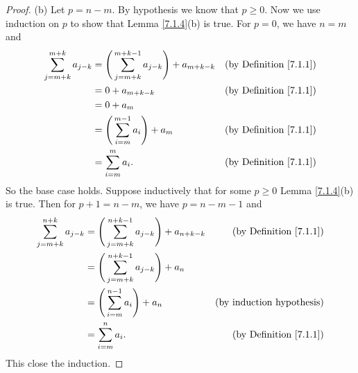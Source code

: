 \begin{proof}{(b)}
    Let \(p = n - m\).
    By hypothesis we know that \(p \geq 0\).
    Now we use induction on \(p\) to show that Lemma \ref{7.1.4}(b) is true.
    For \(p = 0\), we have \(n = m\) and
    \begin{align*}
        \sum_{j = m + k}^{m + k} a_{j - k} & = \Bigg(\sum_{j = m + k}^{m + k - 1} a_{j - k}\Bigg) + a_{m + k - k} & \text{(by Definition \ref{7.1.1})} \\
                                           & = 0 + a_{m + k - k}                                                  & \text{(by Definition \ref{7.1.1})} \\
                                           & = 0 + a_m                                                                                                 \\
                                           & = \Bigg(\sum_{i = m}^{m - 1} a_i\Bigg) + a_m                         & \text{(by Definition \ref{7.1.1})} \\
                                           & = \sum_{i = m}^m a_i.                                                & \text{(by Definition \ref{7.1.1})}
    \end{align*}
    So the base case holds.
    Suppose inductively that for some \(p \geq 0\) Lemma \ref{7.1.4}(b) is true.
    Then for \(p + 1 = n - m\), we have \(p = n - m - 1\) and
    \begin{align*}
        \sum_{j = m + k}^{n + k} a_{j - k} & = \Bigg(\sum_{j = m + k}^{n + k - 1} a_{j - k}\Bigg) + a_{n + k - k} & \text{(by Definition \ref{7.1.1})} \\
                                           & = \Bigg(\sum_{j = m + k}^{n + k - 1} a_{j - k}\Bigg) + a_n                                                \\
                                           & = \Bigg(\sum_{i = m}^{n - 1} a_i\Bigg) + a_n                         & \text{(by induction hypothesis)}   \\
                                           & = \sum_{i = m}^n a_i.                                                & \text{(by Definition \ref{7.1.1})}
    \end{align*}
    This close the induction.
\end{proof}

